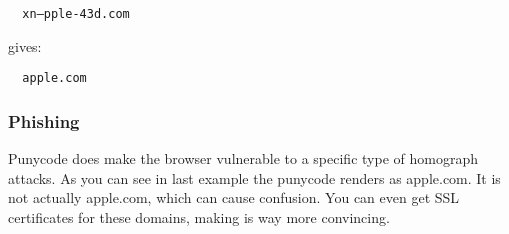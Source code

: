 \begin{verbatim}
  xn–pple-43d.com
\end{verbatim}

gives:
\begin{verbatim}
  apple.com
\end{verbatim}

\subsubsection{Phishing}
Punycode does make the browser vulnerable to a specific type of homograph attacks.
As you can see in last example the punycode renders as apple.com.
It is not actually apple.com, which can cause confusion.
You can even get SSL certificates for these domains, making is way more convincing.
